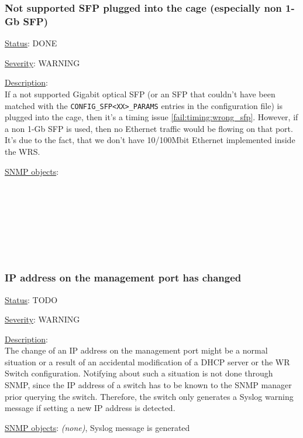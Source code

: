 \subsubsection{\bf Not supported SFP plugged into the cage (especially non 1-Gb SFP)}
		\label{fail:other:sfp}
		\begin{pck_descr}
			\item [] \underline{Status}: DONE
			\item [] \underline{Severity}: WARNING
			\item [] \underline{Description}:\\
        If a not supported Gigabit optical SFP (or an SFP that couldn't have
        been matched with the \texttt{CONFIG\_SFP<XX>\_PARAMS} entries in the
        configuration file) is plugged into the cage, then it's a timing issue
        \ref{fail:timing:wrong_sfp}. However, if a non 1-Gb
				SFP is used, then no Ethernet traffic would be flowing on that port.
				It's due to the fact, that we don't have 10/100Mbit Ethernet implemented
				inside the WRS.
			\item [] \underline{SNMP objects}:\\
        {\footnotesize
				\\
				\\
				\\
				\\
				\\
				\\
				\\
         }
		\end{pck_descr}

\subsubsection{\bf IP address on the management port has changed}
		\begin{pck_descr}
			\item [] \underline{Status}: TODO
			\item [] \underline{Severity}: WARNING
			\item [] \underline{Description}:\\
        The change of an IP address on the management port might be a normal
        situation or a result of an accidental modification of a DHCP server or
        the WR Switch configuration. Notifying about such a situation is not
        done through SNMP, since the IP address of a switch has to be known to
        the SNMP manager prior querying the switch. Therefore, the switch only
        generates a Syslog warning message if setting a new IP address is
        detected.
      \item [] \underline{SNMP objects}: \emph{(none)}, Syslog message is
        generated
		\end{pck_descr}

